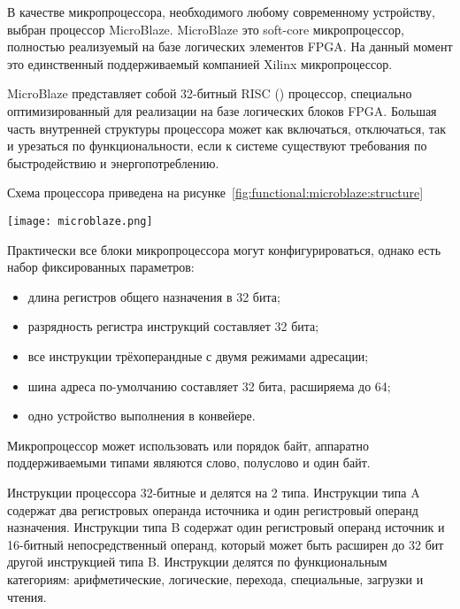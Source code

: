 В качестве микропроцессора, необходимого любому современному устройству, выбран процессор MicroBlaze.
MicroBlaze это soft-core микропроцессор, полностью реализуемый на базе логических элементов FPGA.
На данный момент это единственный поддерживаемый компанией Xilinx микропроцессор.

MicroBlaze представляет собой 32-битный RISC () процессор,
специально оптимизированный для реализации на базе логических блоков FPGA. Большая
часть внутренней структуры процессора может как включаться, отключаться, так и урезаться
по функциональности, если к системе существуют требования по быстродействию и энергопотреблению.

Схема процессора приведена на рисунке~\ref{fig:functional:microblaze:structure}

\begin{center}
  \centering
  \texttt{[image: microblaze.png]}
  \label{fig:functional:microblaze:structure}
\end{center}

Практически все блоки микропроцессора могут конфигурироваться, однако есть набор фиксированных
параметров:
\begin{itemize}
  \item длина регистров общего назначения в 32 бита;
  \item разрядность регистра инструкций составляет 32 бита;
  \item все инструкции трёхоперандные с двумя режимами адресации;
  \item шина адреса по-умолчанию составляет 32 бита, расширяема до 64;
  \item одно устройство выполнения в конвейере.
\end{itemize}

Микропроцессор может использовать  или  порядок байт,
аппаратно поддерживаемыми типами являются слово, полуслово и один байт.

Инструкции процессора 32-битные и делятся на 2 типа. Инструкции типа A содержат
два регистровых операнда источника и один регистровый операнд назначения. Инструкции
типа B содержат один регистровый операнд источник и 16-битный непосредственный операнд,
который может быть расширен до 32 бит другой инструкцией типа B. Инструкции делятся по
функциональным категориям: арифметические, логические, перехода, специальные, загрузки и чтения.

